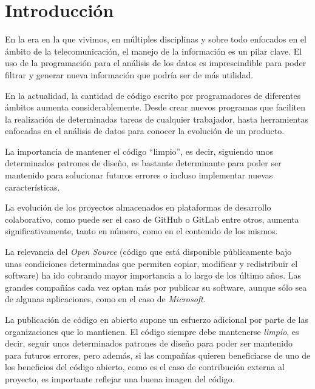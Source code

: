 \documentclass[a4paper, 12pt]{book}
\begin{document}

\cleardoublepage

\chapter{Introducción}
\label{chap:intro}

En la era en la que vivimos, en múltiples disciplinas y sobre todo enfocados en el ámbito de la telecomunicación, el manejo de la información es un pilar clave. El uso de la programación para el análisis de los datos es imprescindible para poder filtrar y generar nueva información que podría ser de más utilidad.

En la actualidad, la cantidad de código escrito por programadores de diferentes ámbitos aumenta considerablemente. Desde crear nuevos programas que faciliten la realización de determinadas tareas de cualquier trabajador, hasta herramientas enfocadas en el análisis de datos para conocer la evolución de un producto.

La importancia de mantener el código ``limpio'', es decir, siguiendo unos determinados patrones de diseño, es bastante determinante para poder ser mantenido para solucionar futuros errores o incluso implementar nuevas características.

La evolución de los proyectos almacenados en plataformas de desarrollo colaborativo, como puede ser el caso de GitHub o GitLab entre otros, aumenta significativamente, tanto en número, como en el contenido de los mismos.

La relevancia del \textit{Open Source} (código que está disponible públicamente bajo unas condiciones determinadas que permiten copiar, modificar y redistribuir el software) ha ido cobrando mayor importancia a lo largo de los último años. Las grandes compañías cada vez optan más por publicar su software, aunque sólo sea de algunas aplicaciones, como en el caso de \textit{Microsoft}.

La publicación de código en abierto supone un esfuerzo adicional por parte de las organizaciones que lo mantienen. El código siempre debe mantenerse \textit{limpio}, es decir, seguir unos determinados patrones de diseño para poder ser mantenido para futuros errores, pero además,  si las compañías quieren beneficiarse de uno de los beneficios del código abierto, como es el caso de contribución externa al proyecto, es importante reflejar una buena imagen del código.
\end{document}
